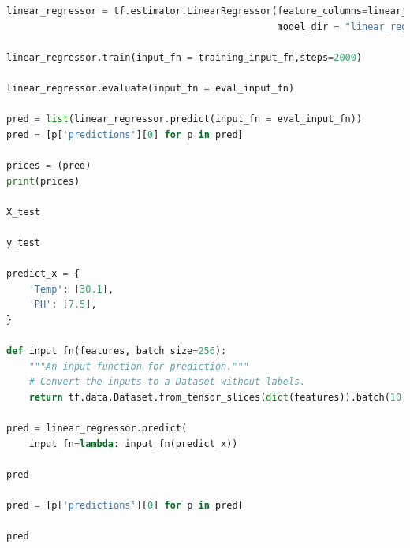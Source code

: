 \begin{lstlisting}[language=python, caption={Linear regression Model Tensorflow API}]
linear_regressor = tf.estimator.LinearRegressor(feature_columns=linear_features,
                                                model_dir = "linear_regressor")

linear_regressor.train(input_fn = training_input_fn,steps=2000)

linear_regressor.evaluate(input_fn = eval_input_fn)

pred = list(linear_regressor.predict(input_fn = eval_input_fn))
pred = [p['predictions'][0] for p in pred]

prices = (pred)
print(prices)

X_test

y_test

predict_x = {
    'Temp': [30.1],
    'PH': [7.5],
}

def input_fn(features, batch_size=256):
    """An input function for prediction."""
    # Convert the inputs to a Dataset without labels.
    return tf.data.Dataset.from_tensor_slices(dict(features)).batch(10)

pred = linear_regressor.predict(
    input_fn=lambda: input_fn(predict_x))

pred

pred = [p['predictions'][0] for p in pred]

pred



\end{lstlisting}\\

